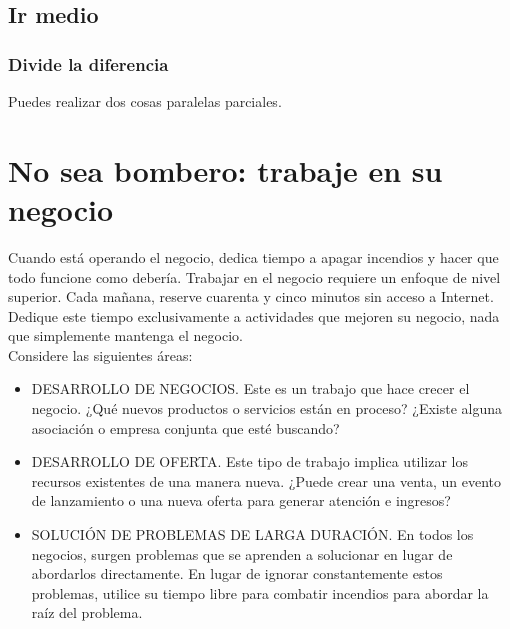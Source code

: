 \documentclass[10pt]{book}
\begin{document}
	    \subsection{Ir medio}

	    \subsubsection{Divide la diferencia}
		Puedes realizar dos cosas paralelas parciales.

	\section{No sea bombero: trabaje en su negocio}
	    Cuando está operando el negocio, dedica tiempo a apagar incendios y hacer que todo funcione como debería. Trabajar en el negocio requiere un enfoque de nivel superior. Cada mañana, reserve cuarenta y cinco minutos sin acceso a Internet. Dedique este tiempo exclusivamente a actividades que mejoren su negocio, nada que simplemente mantenga el negocio.\\
	    Considere las siguientes áreas:
	    \begin{itemize}
		    \item DESARROLLO DE NEGOCIOS. Este es un trabajo que hace crecer el negocio. ¿Qué nuevos productos o servicios están en proceso? ¿Existe alguna asociación o empresa conjunta que esté buscando?
		    \item DESARROLLO DE OFERTA. Este tipo de trabajo implica utilizar los recursos existentes de una manera nueva. ¿Puede crear una venta, un evento de lanzamiento o una nueva oferta para generar atención e ingresos?
		    \item SOLUCIÓN DE PROBLEMAS DE LARGA DURACIÓN. En todos los negocios, surgen problemas que se aprenden a solucionar en lugar de abordarlos directamente. En lugar de ignorar constantemente estos problemas, utilice su tiempo libre para combatir incendios para abordar la raíz del problema.
	    \end{itemize}
\end{document}
